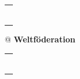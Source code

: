 \documentclass[11pt,a4paper]{article}
\author{Andreas Hemmetter}
\begin{document}
\pagestyle{fancyplain}
\fancyhf{}
\begin{center}

\begin{tabular}[t]{@{}l}
\rule[4pt]{0.29\linewidth}{4pt}
\end{tabular}
\begin{tabular}[t]{@{}}
\fontsize{24pt}{10pt}
\textbf{Weltföderation}
\end{tabular}
\begin{tabular}[t]{r@{}}
\rule[4pt]{0.29\linewidth}{4pt}
\end{tabular}
\end{center}
\end{document}
